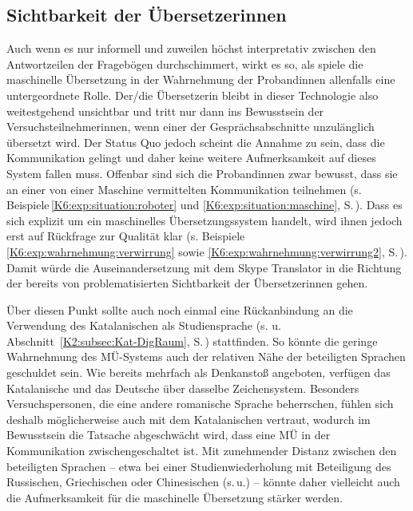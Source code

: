 \subsection{Sichtbarkeit der Übersetzer{\textperiodcentered}innen}\label{K7:para:sichtbarkeit-uebersetzer}
\begin{sloppypar}
Auch wenn es nur informell und zuweilen höchst interpretativ zwischen den Antwortzeilen der Fragebögen durchschimmert, wirkt es so, als spiele die maschinelle Übersetzung in der Wahrnehmung der Proband{\textperiodcentered}innen allenfalls eine untergeordnete Rolle. Der/die Übersetzer{\textperiodcentered}in bleibt in dieser Technologie also weitestgehend unsichtbar und tritt nur dann ins Bewusstsein der Versuchsteilnehmer{\textperiodcentered}innen, wenn einer der Gesprächsabschnitte unzulänglich übersetzt wird. Der Status Quo jedoch scheint die Annahme zu sein, dass die Kommunikation gelingt und daher keine weitere Aufmerksamkeit auf dieses System fallen muss. Offenbar sind sich die Proband{\textperiodcentered}innen zwar bewusst, dass sie an einer von einer Maschine vermittelten Kommunikation teilnehmen (s. Beispiele\,\ref{K6:exp:situation:roboter} und \ref{K6:exp:situation:maschine}, S.\,\pageref{K6:exp:situation:roboter}). Dass es sich explizit um ein maschinelles Übersetzungssystem handelt, wird ihnen jedoch erst auf Rückfrage zur Qualität klar (s. Beispiele \ref{K6:exp:wahrnehmung:verwirrung} sowie \ref{K6:exp:wahrnehmung:verwirrung2}, S.\,\pageref{K6:exp:wahrnehmung:verwirrung}). Damit würde die Auseinandersetzung mit dem Skype Translator in die Richtung der bereits von \citet[]{venuti_translators_1986} problematisierten Sichtbarkeit der Übersetzer{\textperiodcentered}innen gehen. 
\end{sloppypar}

Über diesen Punkt sollte auch noch einmal eine Rückanbindung an die Verwendung des Katalanischen als Studiensprache (s. u. Abschnitt~\ref{K2:subsec:Kat-DigRaum}, S.\,\pageref{K2:subsec:Kat-DigRaum}) stattfinden. So könnte die geringe Wahrnehmung des MÜ-Systems auch der relativen Nähe der beteiligten Sprachen geschuldet sein. Wie bereits mehrfach als Denkanstoß angeboten, verfügen das Katalanische und das Deutsche über dasselbe Zeichensystem. Besonders Versuchspersonen, die eine andere romanische Sprache beherrschen, fühlen sich deshalb möglicherweise auch mit dem Katalanischen vertraut, wodurch im Bewusstsein die Tatsache abgeschwächt wird, dass eine MÜ in der Kommunikation zwischengeschaltet ist. Mit zunehmender Distanz zwischen den beteiligten Sprachen -- etwa bei einer Studienwiederholung mit Beteiligung des Russischen, Griechischen oder Chinesischen (s.\,u.) -- könnte daher vielleicht auch die Aufmerksamkeit für die maschinelle Übersetzung stärker werden.

